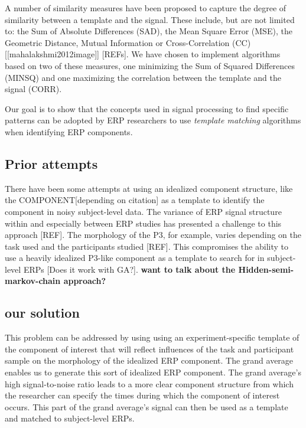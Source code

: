 \documentclass[
  man,floatsintext]{apa7}
\begin{document}
A number of similarity measures have been proposed to capture the degree of similarity between a template and the signal. These include, but are not limited to: the Sum of Absolute Differences (SAD), the Mean Square Error (MSE), the Geometric Distance, Mutual Information or Cross-Correlation (CC){[}{[}mahalakshmi2012image{]}{]} {[}REFs{]}. We have chosen to implement algorithms based on two of these measures, one minimizing the Sum of Squared Differences (MINSQ) and one maximizing the correlation between the template and the signal (CORR).

Our goal is to show that the concepts used in signal processing to find specific patterns can be adopted by ERP researchers to use \emph{template matching} algorithms when identifying ERP components.

\hypertarget{prior-attempts}{%
\subsection{Prior attempts}\label{prior-attempts}}

There have been some attempts at using an idealized component structure, like the COMPONENT{[}depending on citation{]} as a template to identify the component in noisy subject-level data. The variance of ERP signal structure within and especially between ERP studies has presented a challenge to this approach {[}REF{]}. The morphology of the P3, for example, varies depending on the task used and the participants studied {[}REF{]}. This compromises the ability to use a heavily idealized P3-like component as a template to search for in subject-level ERPs {[}Does it work with GA?{]}. \textbf{want to talk about the Hidden-semi-markov-chain approach?}

\hypertarget{our-solution}{%
\subsection{our solution}\label{our-solution}}

This problem can be addressed by using using an experiment-specific template of the component of interest that will reflect influences of the task and participant sample on the morphology of the idealized ERP component. The grand average enables us to generate this sort of idealized ERP component. The grand average's high signal-to-noise ratio leads to a more clear component structure from which the researcher can specify the times during which the component of interest occurs. This part of the grand average's signal can then be used as a template and matched to subject-level ERPs.
\end{document}
